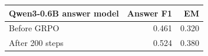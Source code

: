 \begin{tabular}{lrr}
\hline
Qwen3-0.6B answer model & Answer F1 & EM \\ \hline
Before GRPO & 0.461 & 0.320 \\
After 200 steps & 0.524 & 0.380 \\
\hline
\end{tabular}
